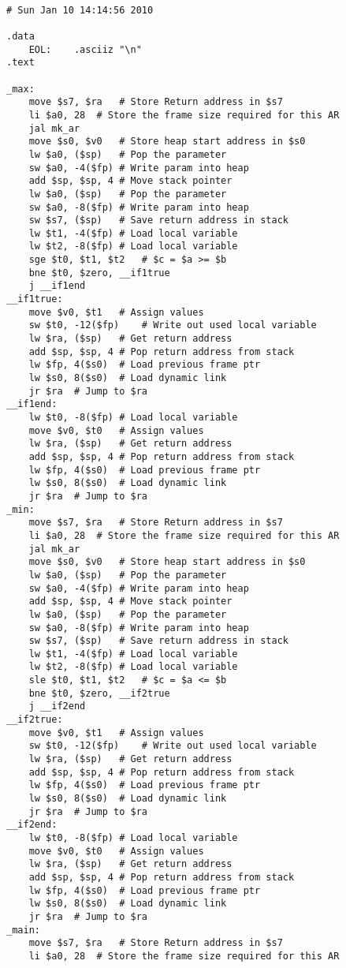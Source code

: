 \begin{lstlisting}[showstringspaces=false,breaklines=true,backgroundcolor=\color{light-gray}, captionpos=b]
         
# Sun Jan 10 14:14:56 2010

.data
	EOL:	.asciiz "\n"
.text

_max:
	move $s7, $ra	# Store Return address in $s7
	li $a0, 28	# Store the frame size required for this AR
	jal mk_ar
	move $s0, $v0	# Store heap start address in $s0
	lw $a0, ($sp)	# Pop the parameter
	sw $a0, -4($fp)	# Write param into heap
	add $sp, $sp, 4	# Move stack pointer
	lw $a0, ($sp)	# Pop the parameter
	sw $a0, -8($fp)	# Write param into heap
	sw $s7, ($sp)	# Save return address in stack
	lw $t1, -4($fp)	# Load local variable
	lw $t2, -8($fp)	# Load local variable
	sge $t0, $t1, $t2	# $c = $a >= $b
	bne $t0, $zero, __if1true
	j __if1end
__if1true:
	move $v0, $t1	# Assign values
	sw $t0, -12($fp)	# Write out used local variable
	lw $ra, ($sp)	# Get return address
	add $sp, $sp, 4	# Pop return address from stack
	lw $fp, 4($s0)	# Load previous frame ptr
	lw $s0, 8($s0)	# Load dynamic link
	jr $ra	# Jump to $ra
__if1end:
	lw $t0, -8($fp)	# Load local variable
	move $v0, $t0	# Assign values
	lw $ra, ($sp)	# Get return address
	add $sp, $sp, 4	# Pop return address from stack
	lw $fp, 4($s0)	# Load previous frame ptr
	lw $s0, 8($s0)	# Load dynamic link
	jr $ra	# Jump to $ra
_min:
	move $s7, $ra	# Store Return address in $s7
	li $a0, 28	# Store the frame size required for this AR
	jal mk_ar
	move $s0, $v0	# Store heap start address in $s0
	lw $a0, ($sp)	# Pop the parameter
	sw $a0, -4($fp)	# Write param into heap
	add $sp, $sp, 4	# Move stack pointer
	lw $a0, ($sp)	# Pop the parameter
	sw $a0, -8($fp)	# Write param into heap
	sw $s7, ($sp)	# Save return address in stack
	lw $t1, -4($fp)	# Load local variable
	lw $t2, -8($fp)	# Load local variable
	sle $t0, $t1, $t2	# $c = $a <= $b
	bne $t0, $zero, __if2true
	j __if2end
__if2true:
	move $v0, $t1	# Assign values
	sw $t0, -12($fp)	# Write out used local variable
	lw $ra, ($sp)	# Get return address
	add $sp, $sp, 4	# Pop return address from stack
	lw $fp, 4($s0)	# Load previous frame ptr
	lw $s0, 8($s0)	# Load dynamic link
	jr $ra	# Jump to $ra
__if2end:
	lw $t0, -8($fp)	# Load local variable
	move $v0, $t0	# Assign values
	lw $ra, ($sp)	# Get return address
	add $sp, $sp, 4	# Pop return address from stack
	lw $fp, 4($s0)	# Load previous frame ptr
	lw $s0, 8($s0)	# Load dynamic link
	jr $ra	# Jump to $ra
_main:
	move $s7, $ra	# Store Return address in $s7
	li $a0, 28	# Store the frame size required for this AR

\end{lstlisting}

